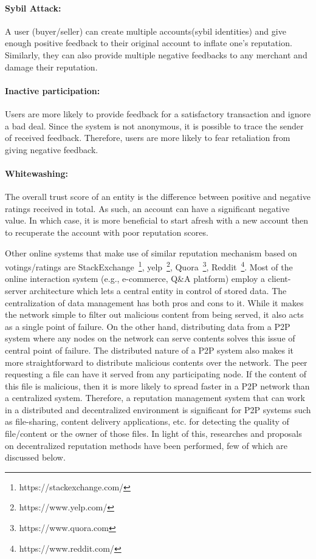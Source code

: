 \paragraph{Sybil Attack:} A user (buyer/seller) can create multiple
accounts(sybil identities) and give enough positive feedback to their original
account to inflate one's reputation.  Similarly, they can also provide multiple
negative feedbacks to any merchant and damage their reputation.
\paragraph{Inactive participation:} Users are more likely to provide feedback
for a satisfactory transaction and ignore a bad deal. Since the system is not
anonymous, it is possible to trace the sender of received feedback. Therefore,
users are more likely to fear retaliation from giving negative feedback.
\paragraph{Whitewashing:} The overall trust score of an entity is the
difference between positive and negative ratings received in total. As such, an
account can have a significant negative value. In which case, it is more
beneficial to start afresh with a new account then to recuperate the account
with poor reputation scores.

Other online systems that make use of similar reputation mechanism based on
votings/ratings are StackExchange~\footnote{https://stackexchange.com/},
yelp~\footnote{https://www.yelp.com/}, Quora~\footnote{https://www.quora.com},
Reddit~\footnote{https://www.reddit.com/}. Most of the online interaction
system (e.g., e-commerce, Q\&A platform) employ a client-server architecture
which lets a central entity in control of stored data. The centralization of
data management has both pros and cons to it. While it makes the network simple
to filter out malicious content from being served, it also acts as a single
point of failure. On the other hand, distributing data from a P2P system where
any nodes on the network can serve contents solves this issue of central point
of failure. The distributed nature of a P2P system also makes it more
straightforward to distribute malicious contents over the network. The peer
requesting a file can have it served from any participating node. If the
content of this file is malicious, then it is more likely to spread faster in a
P2P network than a centralized system. Therefore, a reputation management
system that can work in a distributed and decentralized environment is
significant for P2P systems such as file-sharing, content delivery
applications, etc. for detecting the quality of file/content or the owner of
those files. In light of this, researches and proposals on decentralized
reputation methods have been performed, few of which are discussed below.\\ 








